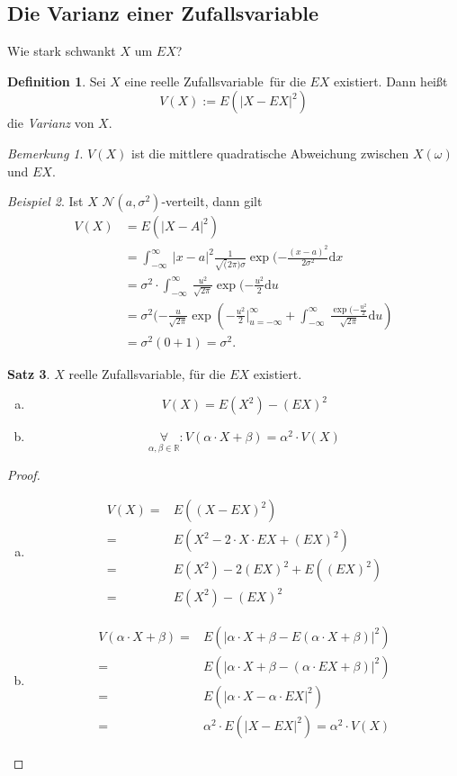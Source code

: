 \documentclass[a4paper,12pt,fleqn]{scrartcl}
\newcommand{\R}{\mathbb{R}}
\newcommand{\m}[1]{\mathcal{ #1 }}
\newcommand{\ZV}{Zufallsvariable}
\newcommand{\fa}[1]{\mathop{\forall}\limits_{#1}}
\theoremstyle{definition}
\newtheorem{definition}{Definition}[section]
\newtheorem{satz}[definition]{Satz}
\theoremstyle{plain}
\theoremstyle{remark}
\newtheorem*{bemerkung}{Bemerkung}
\newtheorem{beispiel}[definition]{Beispiel}
\begin{document}
\subsection{Die Varianz einer \ZV}
Wie stark schwankt $X$ um $EX$?
\begin{definition}
Sei $X$ eine reelle \ZV \, für die $EX$ existiert. Dann heißt
\[V(X):=E(|X-EX|^2)\]
die \emph{Varianz} von $X$.
\end{definition}
\begin{bemerkung}
$V(X)$ ist die mittlere quadratische Abweichung zwischen $X(\omega)$ und $EX$.
\end{bemerkung}
\begin{beispiel}
Ist $X$ $\m{N}(a,\sigma^2)$-verteilt, dann gilt
\begin{align*}
V(X)&=E(|X-A|^2)\\
&= \int_{-\infty}^{\infty}\: |x-a|^2\frac{1}{\sqrt(2\pi)\sigma}\exp(-\frac{(x-a)^2}{2\sigma^2}\mathrm{d}x\tag{Korollar 5.26}\\
&=\sigma^2\cdot\int_{-\infty}^{\infty}\: \frac{u^2}{\sqrt{2\pi}}\exp(-\frac{u^2}{2}\mathrm{d}u\\
&=\sigma^2(-\frac{u}{\sqrt{2\pi}}\exp(-\frac{u^2}{2}|_{u=-\infty}^{\infty}+\int_{-\infty}^{\infty}\: \frac{\exp(-\frac{u^2}{2}}{\sqrt{2\pi}}\mathrm{d}u)\\
&=\sigma^2(0+1)=\sigma^2.
\end{align*}
\end{beispiel}
\begin{satz}
$X$ reelle \ZV, für die $EX$ existiert.
\begin{enumerate}[a)]
\item \[V(X)=E(X^2)-(EX)^2\]
\item \[\fa{\alpha,\beta\in\R}:V(\alpha\cdot X+\beta)=\alpha^2\cdot V(X)\]
\end{enumerate}
\end{satz}
\begin{proof}
\begin{enumerate}[a)]
\item \begin{align*}
V(X)=&E((X-EX)^2)\\
=&E(X^2-2\cdot X\cdot EX + (EX)^2)\\
=&E(X^2)-2(EX)^2+E((EX)^2)\\
=&E(X^2)-(EX)^2
\end{align*}
\item \begin{align*}
V(\alpha\cdot X+\beta)=&E(|\alpha\cdot X+\beta-E(\alpha\cdot X+\beta)|^2)\\
=&E(|\alpha\cdot X+\beta-(\alpha\cdot EX+\beta)|^2)\\
=&E(|\alpha\cdot X-\alpha\cdot EX|^2)\\
=&\alpha^2\cdot E(|X-EX|^2)=\alpha^2\cdot V(X)
\end{align*}
\end{enumerate}
\end{proof}
\end{document}
